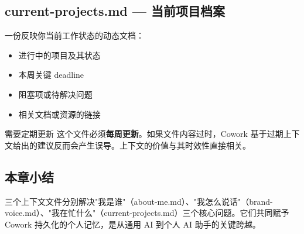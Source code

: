 \subsection{current-projects.md --- 当前项目档案}

一份反映你当前工作状态的动态文档：

\begin{itemize}
    \item 进行中的项目及其状态
    \item 本周关键 deadline
    \item 阻塞项或待解决问题
    \item 相关文档或资源的链接
\end{itemize}

\begin{warningbox}{需要定期更新}
这个文件必须\textbf{每周更新}。如果文件内容过时，Cowork 基于过期上下文给出的建议反而会产生误导。上下文的价值与其时效性直接相关。
\end{warningbox}

\subsection{本章小结}

三个上下文文件分别解决"我是谁"（about-me.md）、"我怎么说话"（brand-voice.md）、"我在忙什么"（current-projects.md）三个核心问题。它们共同赋予 Cowork 持久化的个人记忆，是从通用 AI 到个人 AI 助手的关键跨越。

